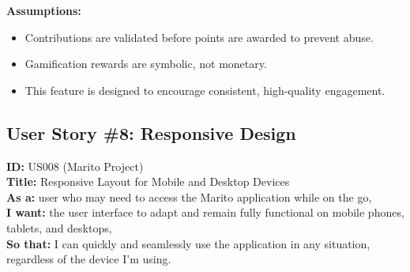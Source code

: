 \documentclass[12pt]{article}
\begin{document}
\vspace{1em}
\textbf{Assumptions:}
\begin{itemize}
    \item Contributions are validated before points are awarded to prevent abuse.
    \item Gamification rewards are symbolic, not monetary.
    \item This feature is designed to encourage consistent, high-quality engagement.
\end{itemize}


\subsection{User Story \#8: Responsive Design}
\textbf{ID:} US008 (Marito Project) \\
\textbf{Title:} Responsive Layout for Mobile and Desktop Devices \\
\textbf{As a:} user who may need to access the Marito application while on the go, \\
\textbf{I want:} the user interface to adapt and remain fully functional on mobile phones, tablets, and desktops, \\
\textbf{So that:} I can quickly and seamlessly use the application in any situation, regardless of the device I'm using.
\end{document}
